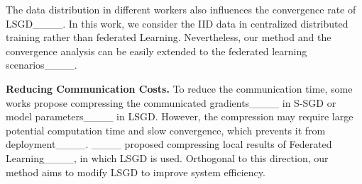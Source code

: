 

The data distribution in different workers also influences the convergence rate of LSGD____. In this work, we consider the IID data in centralized distributed training rather than federated Learning. Nevertheless, our method and the convergence analysis can be easily extended to the federated learning scenarios____.


\textbf{Reducing Communication Costs.}
To reduce the communication time, some works propose compressing the communicated gradients____ in S-SGD or model parameters____ in LSGD. However, the compression may require large potential computation time and slow convergence, which prevents it from deployment____. ____ proposed compressing local results of Federated Learning____, in which LSGD is used. Orthogonal to this direction, our method aims to modify LSGD to improve system efficiency.









\vspace{-0.1cm}